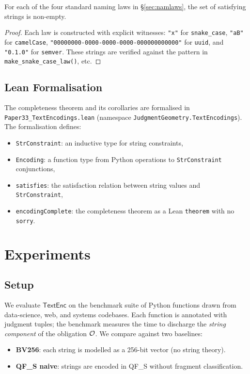 \documentclass[11pt]{article}
\newcommand{\TextEnc}{\ensuremath{\mathsf{TextEnc}}}
\newcommand{\QFS}{\textsf{QF\_S}}
\begin{document}
\begin{corollary}
\label{cor:namlaws}
For each of the four standard naming laws in \S\ref{sec:namlaws}, the set
of satisfying strings is non-empty.
\end{corollary}

\begin{proof}
Each law is constructed with explicit witnesses: \texttt{"x"} for
\texttt{snake\_case}, \texttt{"aB"} for \texttt{camelCase},
\texttt{"00000000-0000-0000-0000-000000000000"} for \texttt{uuid}, and
\texttt{"0.1.0"} for \texttt{semver}.  These strings are verified against
the pattern in \texttt{make\_snake\_case\_law()}, etc.
\end{proof}

\subsection{Lean Formalisation}
\label{sec:lean}

The completeness theorem and its corollaries are formalised in
\texttt{Paper33\_TextEncodings.lean} (namespace
\texttt{JudgmentGeometry.TextEncodings}).  The formalisation defines:
\begin{itemize}
  \item \texttt{StrConstraint}: an inductive type for string constraints,
  \item \texttt{Encoding}: a function type from Python operations to
    \texttt{StrConstraint} conjunctions,
  \item \texttt{satisfies}: the satisfaction relation between string values and
    \texttt{StrConstraint},
  \item \texttt{encodingComplete}: the completeness theorem as a Lean
    \texttt{theorem} with no \texttt{sorry}.
\end{itemize}

\section{Experiments}
\label{sec:experiments}

\subsection{Setup}
\label{sec:setup}

We evaluate \TextEnc{} on the \JuGeo{} benchmark suite of \numcases{}
Python functions drawn from data-science, web, and systems codebases.  Each
function is annotated with \JuGeo{} judgment tuples; the benchmark measures
the time to discharge the \emph{string component} of the obligation
$\mathcal{O}$.  We compare against two baselines:
\begin{itemize}
  \item \textbf{BV256}: each string is modelled as a 256-bit vector (no
    string theory).
  \item \textbf{QF\_S naive}: strings are encoded in \QFS{} without fragment
    classification.
\end{itemize}
\end{document}
